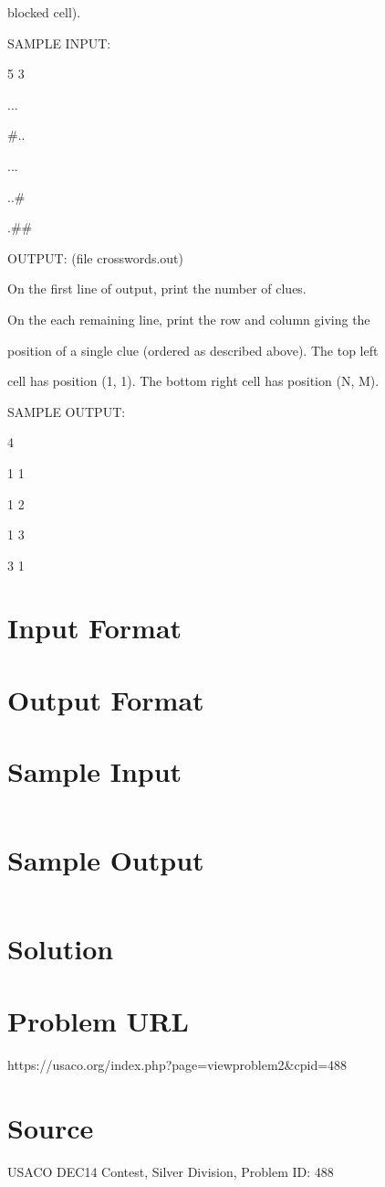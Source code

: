 \documentclass[12pt]{article}
\begin{document}
blocked cell).



SAMPLE INPUT:



5 3

...

#..

...

..#

.##



OUTPUT: (file crosswords.out)



On the first line of output, print the number of clues.



On the each remaining line, print the row and column giving the

position of a single clue (ordered as described above).  The top left

cell has position (1, 1).  The bottom right cell has position (N, M).



SAMPLE OUTPUT: 



4

1 1

1 2

1 3

3 1






\section*{Input Format}


\section*{Output Format}


\section*{Sample Input}
\begin{verbatim}

\end{verbatim}

\section*{Sample Output}
\begin{verbatim}

\end{verbatim}

\section*{Solution}


\section*{Problem URL}
https://usaco.org/index.php?page=viewproblem2&cpid=488

\section*{Source}
USACO DEC14 Contest, Silver Division, Problem ID: 488
\end{document}
